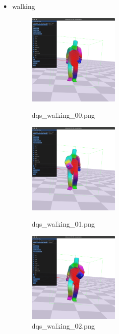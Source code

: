 \documentclass[a4paper,10pt,uplatex,dvipdfmx]{jsarticle}
\begin{document}
\begin{itemize}
  \item walking
  \begin{figure}[H]
    \begin{minipage}{0.33\hsize}
      \begin{center}
        \includegraphics[width=45mm]{img/dqs_walking_00.png}
        \caption{dqs\_walking\_00.png}
      \end{center}
    \end{minipage}
    \begin{minipage}{0.33\hsize}
      \begin{center}
        \includegraphics[width=45mm]{img/dqs_walking_01.png}
        \caption{dqs\_walking\_01.png}
      \end{center}
    \end{minipage}
    \begin{minipage}{0.33\hsize}
      \begin{center}
        \includegraphics[width=45mm]{img/dqs_walking_02.png}
        \caption{dqs\_walking\_02.png}
      \end{center}
    \end{minipage}
  \end{figure}
\end{itemize}
\end{document}
